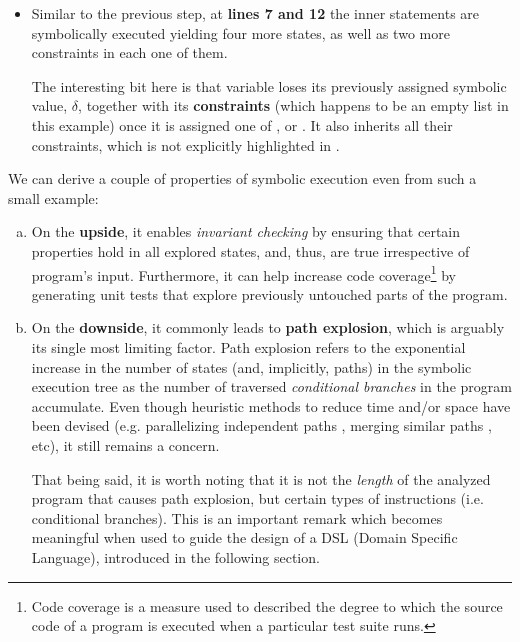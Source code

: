 \begin{itemize}
  \item Similar to the previous step, at \textbf{lines 7 and 12} the inner
     statements are symbolically executed yielding four
    more states, as well as two more constraints in each one of them.

    The interesting bit here is that variable \vmax{} loses its previously
    assigned symbolic value, $\delta$, together with its \textbf{constraints}
    (which happens to be an empty list in this example) once it is assigned one
    of \pa{}, \pb{} or \pc{}.  It also inherits all their constraints, which is
    not explicitly highlighted in .
\end{itemize}

We can derive a couple of properties of symbolic execution even from such a
small example:
\begin{enumerate}[a)]
  \item On the \textbf{upside}, it enables \emph{invariant checking} by
    ensuring that certain properties hold in all explored states, and, thus,
    are true irrespective of program's input.  Furthermore, it can help
    increase code coverage\footnote{Code coverage is a measure used to
    described the degree to which the source code of a program is executed when
    a particular test suite runs.} by generating unit tests that explore
    previously untouched parts of the program.

  \item On the \textbf{downside}, it commonly leads to \textbf{path explosion},
    which is arguably its single most limiting factor. Path explosion refers to
    the exponential increase in the number of states (and, implicitly, paths)
    in the symbolic execution tree as the number of traversed \emph{conditional
    branches} in the program accumulate. Even though heuristic methods to
    reduce time and/or space have been devised (e.g. parallelizing independent
    paths \cite{staats2010parallel}, merging similar paths
    \cite{kuznetsov2012efficient}, etc), it still remains a concern.

    That being said, it is worth noting that it is not the \emph{length} of the
    analyzed program that causes path explosion, but certain types of
    instructions (i.e.  conditional branches).  This is an important remark
    which becomes meaningful when used to guide the design of a DSL (Domain
    Specific Language), introduced in the
    following section.
\end{enumerate}


